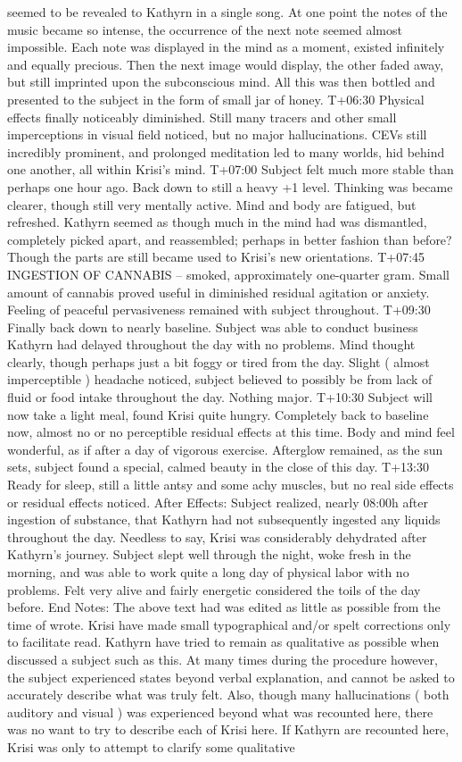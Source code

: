 \documentclass[12pt]{book}
\begin{document}
seemed to be revealed to Kathyrn in a single song. At one point the notes of the music became so intense, the occurrence of the next note seemed almost impossible. Each note was displayed in the mind as a moment, existed infinitely and equally precious. Then the next image would display, the other faded away, but still imprinted upon the subconscious mind. All this was then bottled and presented to the subject in the form of small jar of honey. T+06:30 Physical effects finally noticeably diminished. Still many tracers and other small imperceptions in visual field noticed, but no major hallucinations. CEVs still incredibly prominent, and prolonged meditation led to many worlds, hid behind one another, all within Krisi's mind. T+07:00 Subject felt much more stable than perhaps one hour ago. Back down to still a heavy +1 level. Thinking was became clearer, though still very mentally active. Mind and body are fatigued, but refreshed. Kathyrn seemed as though much in the mind had was dismantled, completely picked apart, and reassembled; perhaps in better fashion than before? Though the parts are still became used to Krisi's new orientations. T+07:45 INGESTION OF CANNABIS -- smoked, approximately one-quarter gram. Small amount of cannabis proved useful in diminished residual agitation or anxiety. Feeling of peaceful pervasiveness remained with subject throughout. T+09:30 Finally back down to nearly baseline. Subject was able to conduct business Kathyrn had delayed throughout the day with no problems. Mind thought clearly, though perhaps just a bit foggy or tired from the day. Slight ( almost imperceptible ) headache noticed, subject believed to possibly be from lack of fluid or food intake throughout the day. Nothing major. T+10:30 Subject will now take a light meal, found Krisi quite hungry. Completely back to baseline now, almost no or no perceptible residual effects at this time. Body and mind feel wonderful, as if after a day of vigorous exercise. Afterglow remained, as the sun sets, subject found a special, calmed beauty in the close of this day. T+13:30 Ready for sleep, still a little antsy and some achy muscles, but no real side effects or residual effects noticed. After Effects: Subject realized, nearly 08:00h after ingestion of substance, that Kathyrn had not subsequently ingested any liquids throughout the day. Needless to say, Krisi was considerably dehydrated after Kathyrn's journey. Subject slept well through the night, woke fresh in the morning, and was able to work quite a long day of physical labor with no problems. Felt very alive and fairly energetic considered the toils of the day before. End Notes: The above text had was edited as little as possible from the time of wrote. Krisi have made small typographical and/or spelt corrections only to facilitate read. Kathyrn have tried to remain as qualitative as possible when discussed a subject such as this. At many times during the procedure however, the subject experienced states beyond verbal explanation, and cannot be asked to accurately describe what was truly felt. Also, though many hallucinations ( both auditory and visual ) was experienced beyond what was recounted here, there was no want to try to describe each of Krisi here. If Kathyrn are recounted here, Krisi was only to attempt to clarify some qualitative 
\end{document}
